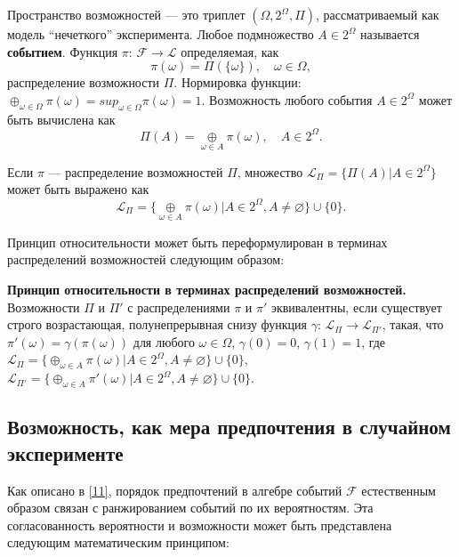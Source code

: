 \documentclass[a4paper, 14pt]{extarticle}
\newcommand{\pplus}{\oplus}
\begin{document}
Пространство возможностей --- это триплет $(\Omega, 2^{\Omega}, \Pi)$, рассматриваемый как модель ``нечеткого'' эксперимента. Любое подмножество $A \in 2^{\Omega}$ называется \textbf{событием}. Функция $\pi$: $\mathcal{F}\to\mathcal{L}$ определяемая, как
\begin{equation}
    \pi(\omega) = \Pi(\{\omega\}), \quad \omega \in \Omega,
\end{equation}
распределение возможности $\Pi$. Нормировка функции: $\pplus_{\omega\in\Omega} \pi(\omega) = sup_{\omega\in\Omega} \pi(\omega) = 1$. Возможность любого события $A \in 2^{\Omega}$ может быть вычислена как
\begin{equation}
    \Pi(A) = \underset{\omega \in A}\pplus \pi(\omega), \quad A \in 2^{\Omega}.
\end{equation}

Если $\pi$ --- распределение возможностей $\Pi$, множество $\mathcal{L}_{\Pi} = \{\Pi(A) | A \in 2^{\Omega}\}$ может быть выражено как
\begin{equation}
    \mathcal{L}_{\Pi} = \{\underset{\omega \in A}\pplus \pi(\omega) | A \in 2^{\Omega}, A \neq \varnothing\} \cup \{0\}.
\end{equation}

Принцип относительности может быть переформулирован в терминах распределений возможностей следующим образом:

\noindent\textbf{Принцип относительности в терминах распределений возможностей.} Возможности $\Pi$ и $\Pi'$ с распределениями $\pi$ и $\pi'$ эквивалентны, если существует строго возрастающая, полунепрерывная снизу функция $\gamma$: $\mathcal{L}_{\Pi} \to \mathcal{L}_{\Pi'}$, такая, что $\pi'(\omega) = \gamma(\pi(\omega))$ для любого $\omega \in \Omega$, $\gamma(0) = 0$, $\gamma(1) = 1$, где $\mathcal{L}_{\Pi} = \{\pplus_{\omega \in A} \pi(\omega) | A \in 2^{\Omega}, A \neq \varnothing\} \cup \{0\}$, $\mathcal{L}_{\Pi'} = \{\pplus_{\omega \in A} \pi'(\omega) | A \in 2^{\Omega}, A \neq \varnothing\} \cup \{0\}$.

\subsection{Возможность, как мера предпочтения в случайном эксперименте}
Как описано в \ref{11}, порядок предпочтений в алгебре событий $\mathcal{F}$ естественным образом связан с ранжированием событий по их вероятностям. Эта согласованность вероятности и возможности может быть представлена следующим математическим принципом: 
\end{document}
